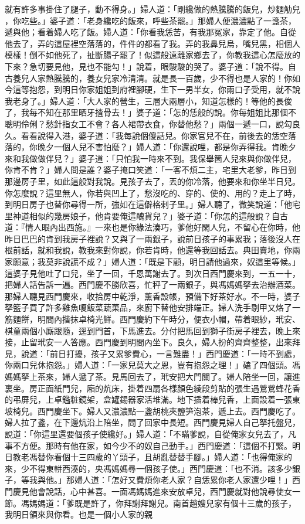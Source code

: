 就有許多事掛住了腿子，動不得身。」婦人道：「剛纔做的熱騰騰的飯兒，炒麵觔兒 ，你吃些。」婆子道：「老身纔吃的飯來，呼些茶罷。」那婦人便濃濃點了一盞茶，遞與他；看着婦人吃了飯。婦人道：「你看我恁苦，有我那冤家，靠定了他。自從他去了，弄的這屋裡空落落的，件件的都看了我。弄的我鼻兒烏，嘴兒黑，相個人模樣！倒不如他死了，扯斷腸子罷了！似這般遠離家鄉去了，你教我這心怎麼放的下來？急切要見他，見也不能勾！」說着，眼駿駿的哭了。婆子道：「說不得。自古養兒人家熱騰騰的，養女兒家冷清清。就是長一百歲，少不得也是人家的！你如今這等抱怨，到明日你家姐姐到府裡腳硬，生下一男半女，你兩口子受用，就不說我老身了。」婦人道：「大人家的營生，三層大兩層小，知道怎樣的！等他的長俊了，我每不知在那里晒牙揸骨去！」婆子道：「怎的恁般的說。你每姐姐比那個不聰明伶俐？愁針指女工不會？各人裙帶衣食，你替他愁？」兩個一遞一口，說勾良久。看看說得入港，婆子道：「我每說個傻話兒。你家官兒不在，前後去的恁空落落的，你晚夕一個人兒不害怕麼？」婦人道：「你還說哩，都是你弄得我。肯晚夕來和我做做伴兒？」婆子道：「只怕我一時來不到。我保舉箇人兒來與你做伴兒，你肯不肯？」婦人問是誰？婆子掩口笑道：「一客不煩二主，宅里大老爹，昨日到那邊房子里，如此這般對我說。見孩子去了，丟的你冷落，他要來和你坐半日兒。你怎麼說？這里無人，你若與凹上了，愁沒吃的、穿的、使的、用的？走上了時，到明日房子也替你尋得一所，強如在這僻格剌子里。」婦人聽了，微笑說道：「他宅里神道相似的幾房娘子，他肯要俺這醜貨兒？」婆子道：「你怎的這般說？自古道：『情人眼內出西施。』一來也是你緣法湊巧，爹他好閑人兒，不留心在你時，他昨日巴巴的肯到我房子裡說？又與了一兩銀子，說前日孩子的事累我；落後沒人在根前話，就和我說，教我來對你說，你若肯時，他還等我回話去。典田賣地，你兩家願意；我莫非說謊不成？」婦人道：「既是下顧，明日請他過來，奴這里等候。」這婆子見他吐了口兒，坐了一回，千恩萬謝去了。到次日西門慶來到，一五一十，把婦人話告訴一遍。西門慶不勝欣喜，忙秤了一兩銀子，與馮媽媽拏去治辦酒菜。那婦人聽見西門慶來，收拾房中乾淨，薰香設帳，預備下好茶好水。不一時，婆子拏籃子買了許多雞魚嗄飯菜蔬菓品，來廚下替他安排端正。婦人洗手剔甲又烙了一筋麵餅，明間內揩抹卓椅光鮮。西門慶約下午時分，便衣小帽，帶着眼紗，玳安、棋童兩個小廝跟隨，逕到門首，下馬進去。分付把馬回到獅子街房子裡去，晚上來接，止留玳安一人答應。西門慶到明間內坐下。良久，婦人扮的齊齊整整，出來拜見，說道：「前日打擾，孩子又累爹費心，一言難盡！」西門慶道：「一時不到處，你兩口兒休抱怨。」婦人道：「一家兒莫大之恩，豈有抱怨之理！」磕了四個頭。馮媽媽拏上茶來，婦人遞了茶。見馬回去了，玳安把大門關了。婦人陪坐一回，讓進裏坐。房正面紙門兒，廂的炕床，掛着四扇各樣顏色綾段剪貼的張生遇鶯鶯蜂花香的弔屏兒，上卓鑑粧鏡架，盒罐錫器家活堆滿。地下插着棒兒香，上面設着一張東坡椅兒。西門慶坐下。婦人又濃濃點一盞胡桃夾鹽笋泡茶，遞上去。西門慶吃了。婦人拉了盞，在下邊炕沿上陪坐，問了回家中長短。西門慶見婦人自己拏托盤兒，說道：「你這里還要個孩子使纔好。」婦人道：「不瞞爹說，自從俺家女兒去了，凡事不方便。那時有他在家，如今少不的奴自己動手。」西門慶道：「這個不打緊。明日教老馮替你看個十三四歲的丫頭子，且胡亂替替手腳。」婦人道：「也得俺家的來，少不得東軿西湊的，央馮媽媽尋一個孩子使。」西門慶道：「也不消。該多少銀子，等我與他。」那婦人道：「怎好又費煩你老人家？自恁累你老人家還少哩！」西門慶見他會說話，心中甚喜。一面馮媽媽進來安放卓兒，西門慶就對他說尋使女一節。馮媽媽道：「爹既是許了，你拜謝拜謝兒。南首趙嫂兒家有個十三歲的孩子，我明日領來與你看。也是一個小人家的親